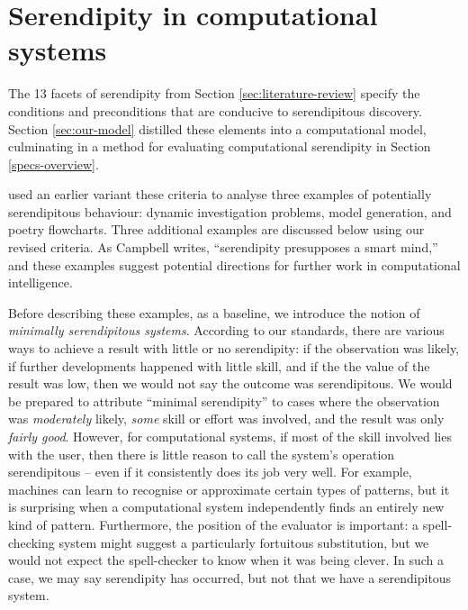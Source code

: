 \section{Serendipity in computational systems} \label{sec:computational-serendipity}

The 13 facets of serendipity from Section \ref{sec:literature-review} specify the
conditions and preconditions that are conducive to serendipitous
discovery.  Section \ref{sec:our-model}
distilled these elements into a computational model,
culminating in a method for evaluating computational
serendipity in Section \ref{specs-overview}.

 used an earlier variant these criteria to
analyse three examples of potentially serendipitous behaviour: dynamic
investigation problems, model generation, and poetry flowcharts.
Three additional examples are discussed below using our revised
criteria.  As Campbell \citeyear{campbell2005serendipity} writes,
``serendipity presupposes a smart mind,'' and these examples suggest
potential directions for further work in computational intelligence.

Before describing these examples, as a baseline, we introduce the
notion of \emph{minimally serendipitous systems}.  According to our
standards, there are various ways to achieve a result with little or
no serendipity: if the observation was likely, if further developments
happened with little skill, and if the the value of the result was
low, then we would not say the outcome was serendipitous.  We would be
prepared to attribute ``minimal serendipity'' to cases where the
observation was \emph{moderately} likely, \emph{some} skill or effort
was involved, and the result was only \emph{fairly good}.  However,
for computational systems, if most of the skill involved lies with the
user, then there is little reason to call the system's operation
serendipitous -- even if it consistently does its job very well.  For
example, machines can learn to recognise or approximate certain types
of patterns, but it is surprising when a computational system
independently finds an entirely new kind of pattern.  Furthermore, the
position of the evaluator is important: a spell-checking system might
suggest a particularly fortuitous substitution, but we would not
expect the spell-checker to know when it was being clever.  In such a
case, we may say serendipity has occurred, but not that we have a
serendipitous system.

